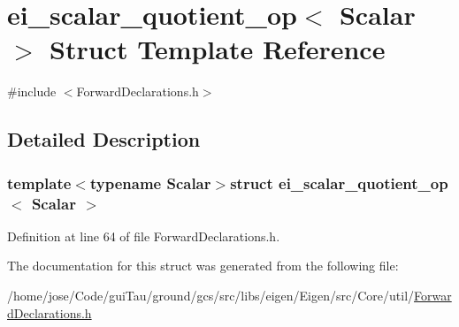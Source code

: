 \hypertarget{structei__scalar__quotient__op}{\section{ei\-\_\-scalar\-\_\-quotient\-\_\-op$<$ Scalar $>$ Struct Template Reference}
\label{structei__scalar__quotient__op}
}


{\ttfamily \#include $<$Forward\-Declarations.\-h$>$}



\subsection{Detailed Description}
\subsubsection*{template$<$typename Scalar$>$struct ei\-\_\-scalar\-\_\-quotient\-\_\-op$<$ Scalar $>$}



Definition at line 64 of file Forward\-Declarations.\-h.



The documentation for this struct was generated from the following file\-:\begin{DoxyCompactItemize}
\item 
/home/jose/\-Code/gui\-Tau/ground/gcs/src/libs/eigen/\-Eigen/src/\-Core/util/\hyperlink{_forward_declarations_8h}{Forward\-Declarations.\-h}\end{DoxyCompactItemize}
